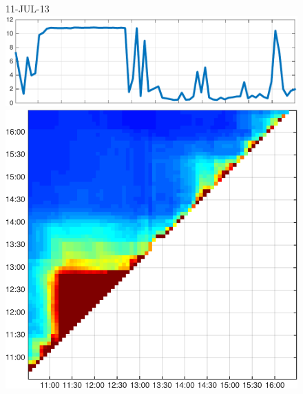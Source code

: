 \begin{figure}
\centering
\begin{minipage}[c]{\mylength}
\centering \scriptsize 11-JUL-13 \\
\includegraphics[valign=t,trim=0 0 5pt 0,angle=90,origin=tr,width=\sunintwidth,totalheight=\eventheight]{events/20130711-intensity.pdf}
\includegraphics[valign=t,width=\eventswidth]{events/20130711-maxGain-local-events.png}

\end{minipage}
\end{figure}
